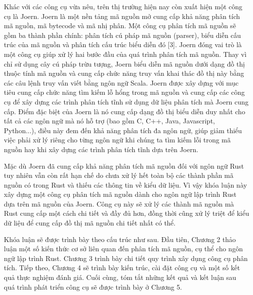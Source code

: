 Khác với các công cụ vừa nêu, trên thị trường hiện nay còn xuất hiện một công cụ
là Joern. Joern là một nền tảng mã nguồn mở cung cấp khả năng phân tích mã nguồn,
mã bytecode và mã nhị phân. Một công cụ phân tích mã nguồn sẽ gồm ba thành phần
chính: phân tích cú pháp mã nguồn (parser), biểu diễn cấu trúc của mã nguồn và phân
tích cấu trúc biểu diễn đó [3]. Joern đóng vai trò là một công cụ giúp xử lý hai bước đầu
của quá trình phân tích mã nguồn. Thay vì chỉ sử dụng cây cú pháp trừu tượng, Joern
biểu diễn mã nguồn dưới dạng đồ thị thuộc tính mã nguồn và cung cấp chức năng truy
vấn khai thác đồ thị này bằng các câu lệnh truy vấn viết bằng ngôn ngữ Scala. Joern
được xây dựng với mục tiêu cung cấp chức năng tìm kiếm lỗ hổng trong mã nguồn và
cung cấp các công cụ để xây dựng các trình phân tích tĩnh sử dụng dữ liệu phân tích mà
Joern cung cấp. Điểm đặc biệt của Joern là nó cung cấp dạng đồ thị biểu diễn duy nhất
cho tất cả các ngôn ngữ mà nó hỗ trợ (bao gồm C, C++, Java, Javascript, Python...), điều
này đem đến khả năng phân tích đa ngôn ngữ, giúp giảm thiểu việc phải xử lý riêng cho
từng ngôn ngữ khi chúng ta tìm kiếm lỗi trong mã nguồn hay khi xây dựng các trình
phân tích tĩnh dựa trên Joern.

Mặc dù Joern đã cung cấp khả năng phân tích mã nguồn đối với ngôn ngữ Rust tuy
nhiên vẫn còn rất hạn chế do chưa xử lý hết toàn bộ các thành phần mã nguồn có trong
Rust và thiếu các thông tin về kiểu dữ liệu. Vì vậy khóa luận này xây dựng một công cụ
phân tích mã nguồn dành cho ngôn ngữ lập trình Rust dựa trên mã nguồn của Joern. Công
cụ này sẽ xử lý các thành mã nguồn mà Rust cung cấp một cách chi tiết và đầy đủ hơn,
đồng thời cũng xử lý triệt để kiểu dữ liệu để cung cấp đồ thị mã nguồn chi tiết nhất có
thể.

Khóa luận sẽ được trình bày theo cấu trúc như sau. Đầu tiên, Chương 2 thảo luận một số kiến thức cơ sở liên quan đến phân tích mã nguồn, cụ thể cho ngôn ngữ lập trình Rust. Chương 3  trình bày chi tiết quy trình xây dụng công cụ phân tích. Tiếp theo, Chương 4 sẽ trình bày kiến trúc, cài đặt công cụ và một số kết quả thực nghiệm đánh giá. Cuối cùng, tóm tắt những kết quả và kết luận sau quá trình phát triển công cụ sẽ được trình bày ở Chương 5.

